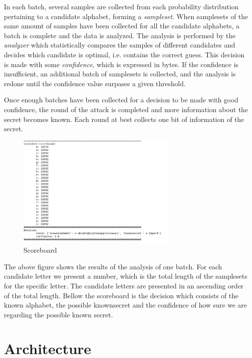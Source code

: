 In each batch, several samples are collected from each probability distribution
pertaining to a candidate alphabet, forming a \textit{sampleset}. When samplesets of the
same amount of samples have been collected for all the candidate
alphabets, a batch is complete and the data is analyzed. The analysis is
performed by the \textit{analyzer} which statistically compares the samples of
different candidates and decides which candidate is optimal, i.e.
contains the correct guess. This decision is made with some \textit{confidence},
which is expressed in bytes. If the confidence is insufficient, an additional
batch of samplesets is collected, and the analysis is redone until the
confidence value surpases a given threshold.

Once enough batches have been collected for a decision to be made with good
confidence, the round of the attack is completed and more information about the
secret becomes known. Each round at best collects one bit of information of the
secret.


\begin{figure}[H] \caption{Scoreboard} \centering
\includegraphics[width=0.7\textwidth]{diagrams/scoreboard.png}\end{figure}

The above figure shows the results of the analysis of one batch. For each candidate letter
we present a number, which is the total length of the samplesets for the specific letter.
The candidate letters are presented in an ascending order of the total length. Bellow the scoreboard
is the decision which consists of the known alphabet, the possible knownsecret and the confidence of
how sure we are regarding the possible known secret.

\section{Architecture}\label{sec:architecture}


